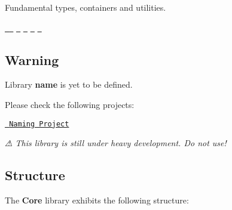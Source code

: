 Fundamental types, containers and utilities.

\href{https://travis-ci.com/open-space-collective/library-core}{\texttt{ }} \href{https://codecov.io/gh/open-space-collective/library-core}{\texttt{ }} \href{https://open-space-collective.github.io/library-core}{\texttt{ }} \href{https://badge.fury.io/gh/open-space-collective%2Flibrary-core}{\texttt{ }} \href{https://badge.fury.io/py/LibraryCorePy}{\texttt{ }} \href{https://opensource.org/licenses/Apache-2.0}{\texttt{ }}

\subsection*{Warning}

Library {\bfseries{name}} is yet to be defined.

Please check the following projects\+:


\begin{DoxyItemize}
\item \href{https://github.com/orgs/open-space-collective/projects/1}{\texttt{ Naming Project}}
\end{DoxyItemize}

{\itshape ⚠ This library is still under heavy development. Do not use!}

\subsection*{Structure}

The {\bfseries{Core}} library exhibits the following structure\+:


